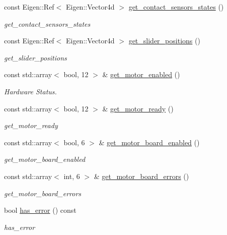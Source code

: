 \begin{DoxyCompactItemize}
const Eigen\+::\+Ref$<$ Eigen\+::\+Vector4d $>$ \hyperlink{classblmc__robots_1_1Solo12_a79d74e1bbae286d8d79a94e328d3ad00}{get\+\_\+contact\+\_\+sensors\+\_\+states} ()
\begin{DoxyCompactList}\small\item\em get\+\_\+contact\+\_\+sensors\+\_\+states \end{DoxyCompactList}\item 
const Eigen\+::\+Ref$<$ Eigen\+::\+Vector4d $>$ \hyperlink{classblmc__robots_1_1Solo12_a2881a38d56aece096ca2c0ca42f2d56c}{get\+\_\+slider\+\_\+positions} ()
\begin{DoxyCompactList}\small\item\em get\+\_\+slider\+\_\+positions \end{DoxyCompactList}\item 
const std\+::array$<$ bool, 12 $>$ \& \hyperlink{classblmc__robots_1_1Solo12_a079e0ab1f33cb8e6cae03a85f58e8c4f}{get\+\_\+motor\+\_\+enabled} ()
\begin{DoxyCompactList}\small\item\em Hardware Status. \end{DoxyCompactList}\item 
const std\+::array$<$ bool, 12 $>$ \& \hyperlink{classblmc__robots_1_1Solo12_a37584471402cef8cf854d69bdbac98eb}{get\+\_\+motor\+\_\+ready} ()
\begin{DoxyCompactList}\small\item\em get\+\_\+motor\+\_\+ready \end{DoxyCompactList}\item 
const std\+::array$<$ bool, 6 $>$ \& \hyperlink{classblmc__robots_1_1Solo12_af9265895ea76870eeeec913cb6794806}{get\+\_\+motor\+\_\+board\+\_\+enabled} ()
\begin{DoxyCompactList}\small\item\em get\+\_\+motor\+\_\+board\+\_\+enabled \end{DoxyCompactList}\item 
const std\+::array$<$ int, 6 $>$ \& \hyperlink{classblmc__robots_1_1Solo12_aac115dccae0a43c10ace81a348f86182}{get\+\_\+motor\+\_\+board\+\_\+errors} ()
\begin{DoxyCompactList}\small\item\em get\+\_\+motor\+\_\+board\+\_\+errors \end{DoxyCompactList}\item 
bool \hyperlink{classblmc__robots_1_1Solo12_a40cd1c76205f1a8a16c1cf1032697479}{has\+\_\+error} () const 
\begin{DoxyCompactList}\small\item\em has\+\_\+error \end{DoxyCompactList}\end{DoxyCompactItemize}
